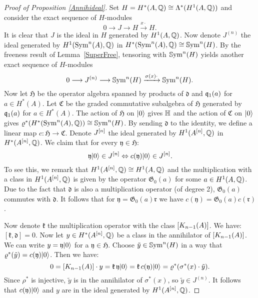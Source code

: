 \begin{proof}[Proof of Proposition \ref{Annihideal}]
Set $H=H^*(A,\Q)\cong \Lambda^*(H^1(A,\Q))$ and consider the exact sequence of $H$-modules
$$
0 \longrightarrow 
J
\longrightarrow H \stackrel{x\cdot}{\longrightarrow} H.
$$
It is clear that $J$ is the ideal in $H$ generated by $H^{1}(A,\Q)$. 
Now denote $J^{(n)}$ the ideal generated by $H^1(\Sym^n(A),\Q)$ in $H^*(\Sym^n(A),\Q)\cong\SSym^n(H)$.
By the freeness result of Lemma~\ref{SuperFree}, tensoring with $\SSym^n(H)$ yields another exact sequence of $H$-modules
$$
0 \longrightarrow {J}^{(n)} \longrightarrow \SSym^n(H) \xrightarrow{\sigma(x)\cdot} \SSym^n(H).
$$
Now let $\mathfrak{H}$ be the operator algebra spanned by products of $\mathfrak d$ and $\q_1(a)$ for $a\in H^*(A)$. Let $\mathfrak C$ be the graded commutative subalgebra of $\mathfrak H$ generated by $\q_1(a)$ for $a\in H^*(A)$. The action of $\mathfrak H$ on $\vac$ gives $\H$ and the action of $\mathfrak C$ on $\vac$ gives $\rho^*(H^*(\Sym^n(A),\Q))\cong \SSym^n(H)$.
By sending $\mathfrak d$ to the identity, we define a linear map $c : \mathfrak H \rightarrow \mathfrak C$. 
Denote $J\hilb{n}$ the ideal generated by $H^1(A\hilb{n},\Q)$ in $H^*(A \hilb n,\Q)$. We claim that for every $\mathfrak y\in \mathfrak H$:
$$
\mathfrak y\vac \in J\hilb{n} \Leftrightarrow c(\mathfrak y)\vac \in J\hilb{n}.
$$
To see this, we remark that $H^1(A \hilb n,\Q) \cong H^1(A ,\Q)  $ and the multiplication with a class in $H^1(A \hilb n,\Q) $ is given by the operator $\mathfrak G_0(a)$ for some $a\in H^1(A ,\Q)$. Due to the fact that $\mathfrak d$ is also a multiplication operator (of degree 2), $\mathfrak G_0(a)$ commutes with $\mathfrak d$. It follows that for $\mathfrak y =\mathfrak G_0(a) \mathfrak r$ we have $c(\mathfrak y) = \mathfrak G_0(a) c(\mathfrak r)$.

Now denote $\mathfrak k$ the multiplication operator with the class $[\kum{A}{n-1}]$. We have:
$
[\mathfrak k, \mathfrak d] = 0.
$
Now let $y\in H^*(A\hilb{n},\Q)$ be a class in the annihilator of $[\kum{A}{n-1}]$. We can write $y= \mathfrak y\vac$ for a $\mathfrak y\in\mathfrak H$. Choose $\tilde y \in \SSym^n (H)$ in a way that $\rho^*(\tilde y) = c(\mathfrak y) \vac$. Then we have:
$$
0=[\kum{A}{n-1}]\cdot y = \mathfrak k\, \mathfrak y \vac =  \mathfrak k \,c(\mathfrak y)\vac = \rho^*(\sigma^*(x) \cdot \tilde y).
$$
Since $\rho^*$ is injective, $\tilde y$ is in the annihilator of $\sigma^*(x)$, so $\tilde y \in J^{(n)}$. It follows that $c(\mathfrak y)\vac$ and $y$ are in the ideal generated by $H^1(A\hilb{n},\Q)$.
\end{proof}

